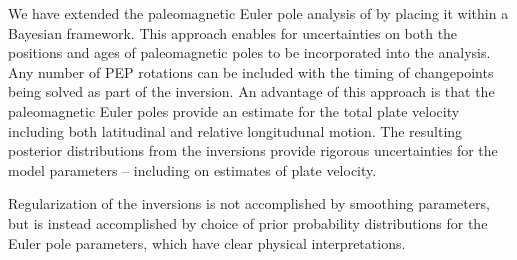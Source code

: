 \documentclass[11pt,letterpaper]{article}
\begin{document}

We have extended the paleomagnetic Euler pole analysis of \citet{Gordon1984a} by placing it within a Bayesian framework. This approach enables for uncertainties on both the positions and ages of paleomagnetic poles to be incorporated into the analysis. Any number of PEP rotations can be included with the timing of changepoints being solved as part of the inversion. An advantage of this approach is that the paleomagnetic Euler poles provide an estimate for the total plate velocity including both latitudinal and relative longitudunal motion. The resulting posterior distributions from the inversions provide rigorous uncertainties for the model parameters -- including on estimates of plate velocity. 

Regularization of the inversions is not accomplished by smoothing parameters, but is instead accomplished by choice of prior probability distributions for the Euler pole parameters, which have clear physical interpretations.
\end{document}
